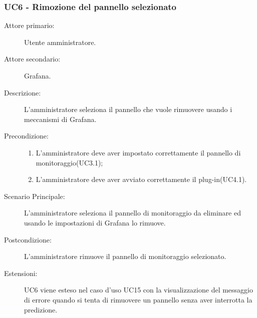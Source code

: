 \subsubsection{UC6 - Rimozione del pannello selezionato}
\label{sssec:uc6}
\begin{description}
	\item[Attore primario:] Utente amministratore.
	\item[Attore secondario:] Grafana.
	\item[Descrizione:] L'amministratore seleziona il pannello che vuole rimuovere usando i meccanismi di Grafana.
	\item[Precondizione:]
	\begin{enumerate}
		\item L'amministratore deve aver impostato correttamente il pannello di monitoraggio(UC3.1);
		\item L'amministratore deve aver avviato correttamente il plug-in(UC4.1).
	\end{enumerate}
	\item[Scenario Principale:] L'amministratore seleziona il pannello di monitoraggio da eliminare ed usando le impostazioni di Grafana lo rimuove.
	\item[Postcondizione:] L'amministratore rimuove il pannello di monitoraggio selezionato.
	\item[Estensioni:] UC6 viene esteso nel caso d'uso UC15 con la visualizzazione del messaggio di errore quando si tenta di rimuovere un pannello senza aver interrotta la predizione.
\end{description}

